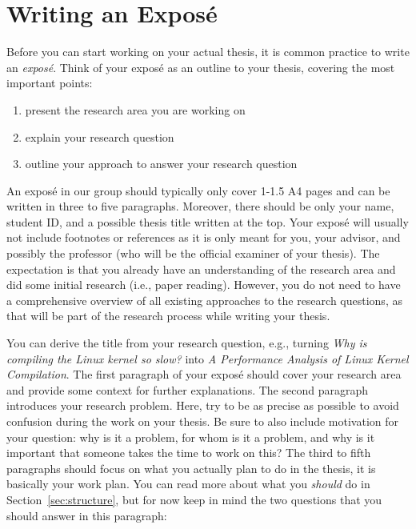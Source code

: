 \documentclass[a4]{article}
\begin{document}
\section{Writing an Expos\'e}
\label{sec:expose}

Before you can start working on your actual thesis, it is common practice to write an \emph{expos\'e}.
Think of your expos\'e as an outline to your thesis, covering the most important points:

\begin{enumerate}
    \item present the research area you are working on
    \item explain your research question
    \item outline your approach to answer your research question
\end{enumerate}

An expos\'e in our group should typically only cover 1-1.5 A4 pages and can be written in three to five paragraphs.
Moreover, there should be only your name, student ID, and a possible thesis title written at the top.
Your expos\'e will usually not include footnotes or references as it is only meant for you, your advisor, and possibly the professor (who will be the official examiner of your thesis).
The expectation is that you already have an understanding of the research area and did some initial research (i.e., paper reading).
However, you do not need to have a comprehensive overview of all existing approaches to the research questions, as that will be part of the research process while writing your thesis.

You can derive the title from your research question, e.g., turning \emph{Why is compiling the Linux kernel so slow?} into \emph{A Performance Analysis of Linux Kernel Compilation}.
The first paragraph of your expos\'e should cover your research area and provide some context for further explanations.
The second paragraph introduces your research problem.
Here, try to be as precise as possible to avoid confusion during the work on your thesis.
Be sure to also include motivation for your question: why is it a problem, for whom is it a problem, and why is it important that someone takes the time to work on this?
The third to fifth paragraphs should focus on what you actually plan to do in the thesis, it is basically your work plan.
You can read more about what you \emph{should} do in Section~\ref{sec:structure}, but for now keep in mind the two questions that you should answer in this paragraph:
\end{document}
